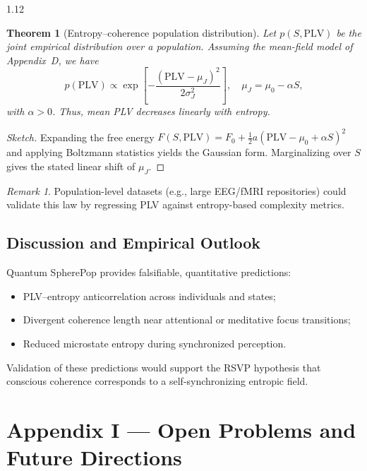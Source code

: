 \documentclass[12pt,a4paper]{article}
\numberwithin{equation}{section}
\newtheorem{theorem}{Theorem}[section]
\theoremstyle{remark}
\newtheorem{remark}{Remark}[section]
\theoremstyle{definition}
\begin{document}
\begin{spacing}{1.12}
\begin{theorem}[Entropy–coherence population distribution]\label{thm:H-pop}
Let $p(S,\mathrm{PLV})$ be the joint empirical distribution over a population.  
Assuming the mean-field model of Appendix~D, we have
\[
p(\mathrm{PLV}) \propto \exp\!\left[-\frac{(\mathrm{PLV}-\mu_J)^2}{2\sigma_J^2}\right],
\quad \mu_J = \mu_0 - \alpha S,
\]
with $\alpha>0$.  Thus, mean PLV decreases linearly with entropy.
\end{theorem}

\begin{proof}[Sketch]
Expanding the free energy $F(S,\mathrm{PLV})=F_0 + \tfrac{1}{2}a(\mathrm{PLV}-\mu_0+\alpha S)^2$ and applying Boltzmann statistics yields the Gaussian form.  
Marginalizing over $S$ gives the stated linear shift of $\mu_J$.
\end{proof}

\begin{remark}
Population-level datasets (e.g., large EEG/fMRI repositories) could validate this law by regressing PLV against entropy-based complexity metrics.
\end{remark}

\subsection{Discussion and Empirical Outlook}\label{sec:H-discussion}
Quantum SpherePop provides falsifiable, quantitative predictions:
\begin{itemize}
\item PLV–entropy anticorrelation across individuals and states;
\item Divergent coherence length near attentional or meditative focus transitions;
\item Reduced microstate entropy during synchronized perception.
\end{itemize}
Validation of these predictions would support the RSVP hypothesis that conscious coherence corresponds to a self-synchronizing entropic field.

\linespread{1.05}
\setlength{\parindent}{0pt}


\section*{Appendix I — Open Problems and Future Directions}


\end{spacing}
\end{document}
